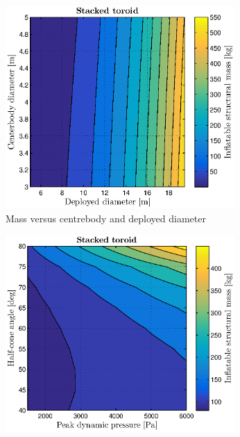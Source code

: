 \begin{figure}[h]
	\centering

	\begin{subfigure}[b]{0.49\textwidth}
		\includegraphics[width=0.96\textwidth]{./Figure/Structure/diameters_test.eps}
		\caption{Mass versus centrebody and deployed diameter}
		\label{fig:diameters_strucmass}
	\end{subfigure}
	\begin{subfigure}[b]{0.49\textwidth}
		\includegraphics[width=0.96\textwidth]{./Figure/Structure/halfcone_test.eps}

\end{subfigure}
\end{figure}
